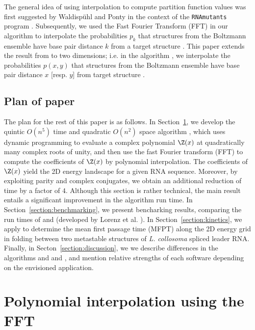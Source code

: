 The general idea of using
interpolation to compute partition function values was first suggested
by Waldisp\"uhl and Ponty in the context of the
{\tt RNAmutants} program \citep{waldispuhlPontyRecomb}. Subsequently,
we used the Fast Fourier Transform (FFT) in our algorithm
\fftbor \citep{fftbor}  to interpolate the
probabilities $p_k$ that structures from the Boltzmann
ensemble have base pair distance $k$ from a target structure \strSt.
This paper extends the result from \citep{fftbor} to two dimensions; i.e.
in the algorithm \ffttwo,
we interpolate the probabilities $p(x,y)$ that
structures from the Boltzmann ensemble have base pair distance
$x$ [resp. $y$] from target structure .

\subsection{Plan of paper}

The plan for the rest of this paper is as follows. In
Section~\ref{section:approach}, we develop the quintic
$O(n^5)$ time and quadratic $O(n^2)$ space algorithm \ffttwo,
which uses dynamic programming to evaluate a complex polynomial
$\Z(x)$ at quadratically many complex roots of unity, and then use the fast
Fourier transform (FFT) to compute the coefficients of $\Z(x)$ by
polynomial interpolation. The coefficients of $\Z(x)$ yield the 2D
energy landscape for a given RNA sequence. Moreover, by exploiting
parity and complex conjugates, we obtain an additional reduction of time
by a factor of $4$. Although this section is rather technical, the
main result entails a significant improvement in the algorithm
run time.
In Section~\ref{section:benchmarking}, we present bencharking results,
comparing the run times of \ffttwo and \rnatwofold
(developed by Lorenz et al.  \citep{hofacker:RNAbor2D}).
In Section~\ref{section:kinetics}, we apply \ffttwo to determine
the mean first passage time (MFPT) along the 2D energy grid in folding
between two metastable structures of {\em L. collosoma} spliced leader
RNA.
Finally, in Secton~\ref{section:discussion}, we we describe
differences in the algorithms \rnatwofold and
and \ffttwo, and mention relative strengths of each software
depending on the envisioned application.

\section{Polynomial interpolation using the FFT}
\label{section:approach}

